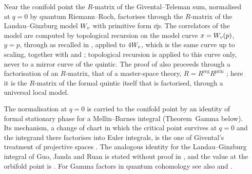 Near the conifold point the $R$-matrix of the Givental--Teleman sum, normalised at $q=0$ by quantum Riemann--Roch, factorises through the $R$-matrix of the Landau--Ginzburg model $W_{v}$ with primitive form $\dd p$. The correlators of the model are computed by topological recursion on the model curve $x=W_{v}(p)$, $y=p$, through \cite[Theorem~4.1]{DuninBarkowski:2012bw} as recalled in \cite[\S2.6]{Dunin-Barkowski:2015caa}, applied to $4W_{v}$, which is the same curve up to scaling, together with \cite{Eynard:2007kz} and \cite[Theorem~7.1]{ABDKS25}; topological recursion is applied to this curve only, never to a mirror curve of the quintic. The proof of \cite{CGYZ26} also proceeds through a factorisation of an $R$-matrix, that of a master-space theory, $R=R^{\mathrm{reg}}R^{\mathrm{prin}}$ \cite[Proposition~3.1]{CGYZ26}; here it is the $R$-matrix of the formal quintic itself that is factorised, through a universal local model. 

The normalisation at $q=0$ is carried to the conifold point by an identity of formal stationary phase for a Mellin--Barnes integral (Theorem~Gamma below). Its mechanism, a change of chart in which the critical point survives at $q=0$ and the integrand there factorises into Euler integrals, is the one of Givental's treatment of projective spaces \cite[\S10]{MR1901075}. The analogous identity for the Landau--Ginzburg integral of Guo, Janda and Ruan is stated without proof in \cite[Remark~7.2]{GJR18}, and the value at the orbifold point is \cite[Lemma~7.7, (37)]{GJR18}. For Gamma factors in quantum cohomology see also \cite[Lemma~4.20]{MR2553377} and \cite{GGI16}. 


